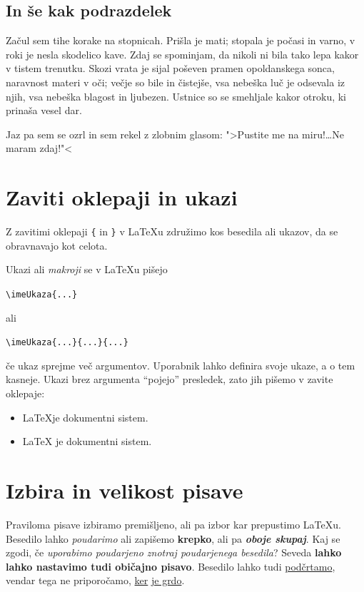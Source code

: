\documentclass[a4paper]{article}
\begin{document}
\subsection{In še kak podrazdelek}

Začul sem tihe korake na stopnicah. Prišla je mati; stopala je počasi in varno, v roki je
nesla skodelico kave. Zdaj se spominjam, da nikoli ni bila tako lepa kakor v tistem
trenutku. Skozi vrata je sijal poševen pramen opoldanskega sonca, naravnost materi v oči;
večje so bile in čistejše, vsa nebeška luč je odsevala iz njih, vsa nebeška blagost in
ljubezen. Ustnice so se smehljale kakor otroku, ki prinaša vesel dar.

Jaz pa sem se ozrl in sem rekel z zlobnim glasom: ">Pustite me na miru!\dots Ne maram zdaj!"<

\section{Zaviti oklepaji in ukazi}

Z zavitimi oklepaji \texttt{\{} in \texttt{\}} v LaTeXu združimo kos besedila ali ukazov,
da se obravnavajo kot celota.

Ukazi ali \emph{makroji} se v LaTeXu pišejo
%
\begin{center}
  \verb|\imeUkaza{...}|
\end{center}
%
ali
%
\begin{center}
  \verb|\imeUkaza{...}{...}{...}|
\end{center}
%
če ukaz sprejme več argumentov. Uporabnik lahko definira svoje ukaze, a o tem kasneje.
Ukazi brez argumenta ``pojejo'' presledek, zato jih pišemo v zavite oklepaje:
%
\begin{itemize}
\item \LaTeX je dokumentni sistem.
\item {\LaTeX} je dokumentni sistem.
\end{itemize}


\section{Izbira in velikost pisave}

Praviloma pisave izbiramo premišljeno, ali pa izbor kar prepustimo LaTeXu.
Besedilo lahko \emph{poudarimo} ali zapišemo \textbf{krepko}, ali pa \emph{\textbf{oboje skupaj}}.
Kaj se zgodi, če \emph{uporabimo poudarjeno \emph{znotraj} poudarjenega besedila}?
Seveda \textbf{lahko lahko nastavimo tudi \textnormal{običajno} pisavo}.
Besedilo lahko tudi \underline{podčrtamo}, vendar tega ne priporočamo, \underline{ker} \underline{je grdo}.
\end{document}

